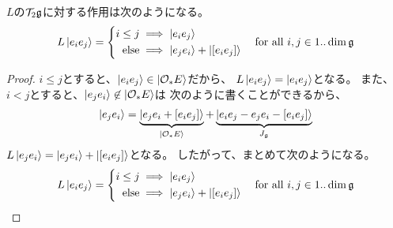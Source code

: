 {	\begin{proposition}[二文字に対するLの作用]
	\label{prop:二文字に対するLの作用} %
		$L$の${{\mathcal{T}}}_2{\mathfrak{g}}$に対する作用は次のようになる。
		\begin{equation*}\begin{split}
			L\mathinner{|{e_ie_j}\rangle} = \left\{\begin{split}
				i \le j &\implies \mathinner{|{e_ie_j}\rangle} \\
				\text{else} &\implies \mathinner{|{e_je_i}\rangle} + \mathinner{|{[e_ie_j]}\rangle} \\
			\end{split}\right. \quad\text{for all } i,j\in 1..\dim{\mathfrak{g}}
		\end{split}\end{equation*}
	\end{proposition} %
	\begin{proof} 
		$i\le j$とすると、$\mathinner{|{e_ie_j}\rangle}\in\mathinner{|{{\ensuremath{{\mathcal{O}}}}_*E}\rangle}$だから、
		$L\mathinner{|{e_ie_j}\rangle}=\mathinner{|{e_ie_j}\rangle}$となる。
		また、$i< j$とすると、$\mathinner{|{e_je_i}\rangle}\not\in\mathinner{|{{\ensuremath{{\mathcal{O}}}}_*E}\rangle}$は
		次のように書くことができるから、
		\begin{equation*}\begin{split}
			\mathinner{|{e_je_i}\rangle} = \underbrace{\mathinner{|{e_je_i + [e_ie_j]}\rangle}}_{\mathinner{|{{\ensuremath{{\mathcal{O}}}}_*E}\rangle}}
				+ \underbrace{\mathinner{|{e_ie_j - e_je_i - [e_ie_j]}\rangle}}_{J_{{\mathfrak{g}}}}
		\end{split}\end{equation*}
		$L\mathinner{|{e_je_i}\rangle}=\mathinner{|{e_je_i}\rangle}+\mathinner{|{[e_ie_j]}\rangle}$となる。
		したがって、まとめて次のようになる。
		\begin{equation*}\begin{split}
			L\mathinner{|{e_ie_j}\rangle} = \left\{\begin{split}
				i \le j &\implies \mathinner{|{e_ie_j}\rangle} \\
				\text{else} &\implies \mathinner{|{e_je_i}\rangle} + \mathinner{|{[e_ie_j]}\rangle} \\
			\end{split}\right. \quad\text{for all } i,j\in 1..\dim{\mathfrak{g}}
		\end{split}\end{equation*}
	\end{proof}

}
